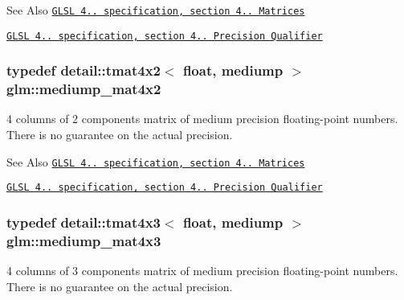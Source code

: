 \begin{DoxySeeAlso}{See Also}
\href{http://www.opengl.org/registry/doc/GLSLangSpec.4.20.8.pdf}{\tt G\-L\-S\-L 4.. specification, section 4.. Matrices} 

\href{http://www.opengl.org/registry/doc/GLSLangSpec.4.20.8.pdf}{\tt G\-L\-S\-L 4.. specification, section 4.. Precision Qualifier} 
\end{DoxySeeAlso}
\hypertarget{group__core__precision_ga5ade2a6a65653683f76988c45da39f15}{
\subsubsection[{mediump\-\_\-mat4x2}]{\setlength{\rightskip}{0pt plus 5cm}typedef detail\-::tmat4x2$<$ float, mediump $>$ {\bf glm\-::mediump\-\_\-mat4x2}}}\label{group__core__precision_ga5ade2a6a65653683f76988c45da39f15}
4 columns of 2 components matrix of medium precision floating-\/point numbers. There is no guarantee on the actual precision.

\begin{DoxySeeAlso}{See Also}
\href{http://www.opengl.org/registry/doc/GLSLangSpec.4.20.8.pdf}{\tt G\-L\-S\-L 4.. specification, section 4.. Matrices} 

\href{http://www.opengl.org/registry/doc/GLSLangSpec.4.20.8.pdf}{\tt G\-L\-S\-L 4.. specification, section 4.. Precision Qualifier} 
\end{DoxySeeAlso}
\hypertarget{group__core__precision_ga445d8aac3a5227af2d1e98d5c2f74d03}{
\subsubsection[{mediump\-\_\-mat4x3}]{\setlength{\rightskip}{0pt plus 5cm}typedef detail\-::tmat4x3$<$ float, mediump $>$ {\bf glm\-::mediump\-\_\-mat4x3}}}\label{group__core__precision_ga445d8aac3a5227af2d1e98d5c2f74d03}
4 columns of 3 components matrix of medium precision floating-\/point numbers. There is no guarantee on the actual precision.

